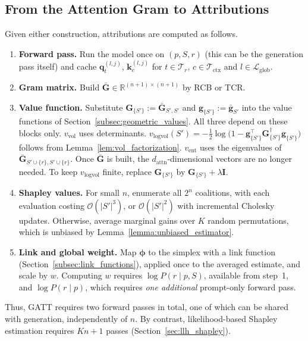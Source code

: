 \documentclass{article}
\begin{document}
\subsection{From the Attention Gram to Attributions}
\label{subsec:gatt_pipeline}

Given either construction, attributions are computed as follows.
\begin{enumerate}
    \item \textbf{Forward pass.} Run the model once on $(p, S, r)$ (this can be the generation pass itself) and cache $\mathbf{q}_t^{(l,j)}$, $\mathbf{k}_c^{(l,j)}$ for $t \in \mathcal{T}_r$, $c \in \mathcal{T}_{\text{ctx}}$ and $l \in \mathcal{L}_{\text{glob}}$.
    \item \textbf{Gram matrix.} Build $\bar{\mathbf{G}} \in \mathbb{R}^{(n+1) \times (n+1)}$ by RCB or TCR.
    \item \textbf{Value function.} Substitute $\mathbf{G}_{\{S'\}} := \bar{\mathbf{G}}_{S',S'}$ and $\mathbf{g}_{\{S'\}} := \bar{\mathbf{g}}_{S'}$ into the value functions of Section~\ref{subsec:geometric_values}. All three depend on these blocks only. $v_{\text{vol}}$ uses determinants. $v_{\text{logvol}}(S') = -\frac{1}{2}\log\big(1 - \mathbf{g}_{\{S'\}}^\top \mathbf{G}_{\{S'\}}^{\dagger} \mathbf{g}_{\{S'\}}\big)$ follows from Lemma~\ref{lem:vol_factorization}. $v_{\text{ent}}$ uses the eigenvalues of $\bar{\mathbf{G}}_{S' \cup \{r\}, S' \cup \{r\}}$. Once $\bar{\mathbf{G}}$ is built, the $d_{\text{attn}}$-dimensional vectors are no longer needed. To keep $v_{\text{logvol}}$ finite, replace $\mathbf{G}_{\{S'\}}$ by $\mathbf{G}_{\{S'\}} + \lambda \mathbf{I}$.
    \item \textbf{Shapley values.} For small $n$, enumerate all $2^n$ coalitions, with each evaluation costing $\mathcal{O}(|S'|^3)$, or $\mathcal{O}(|S'|^2)$ with incremental Cholesky updates. Otherwise, average marginal gains over $K$ random permutations, which is unbiased by Lemma~\ref{lemma:unbiased_estimator}.
    \item \textbf{Link and global weight.} Map $\boldsymbol{\phi}$ to the simplex with a link function (Section~\ref{subsec:link_functions}), applied once to the averaged estimate, and scale by $w$. Computing $w$ requires $\log P(r \mid p, S)$, available from step~1, and $\log P(r \mid p)$, which requires \emph{one additional} prompt-only forward pass.
\end{enumerate}
Thus, GATT requires two forward passes in total, one of which can be shared with generation, independently of $n$. By contrast, likelihood-based Shapley estimation requires $Kn + 1$ passes (Section~\ref{sec:llh_shapley}).
\end{document}
